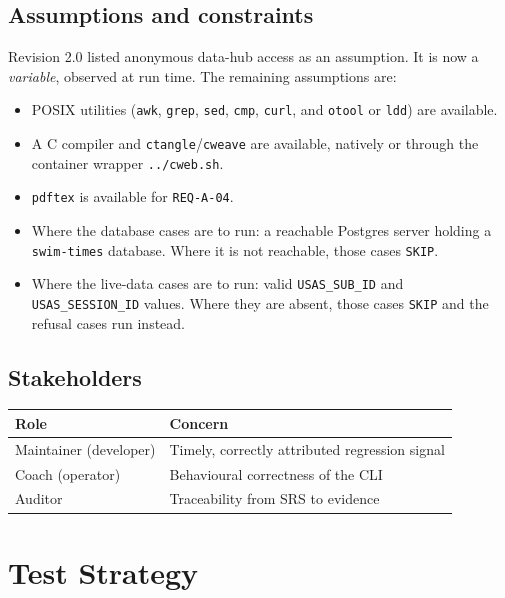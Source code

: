 \documentclass[12pt]{article}
\newcommand{\code}[1]{\texttt{#1}}
\newcommand{\req}[1]{\texttt{#1}}
\begin{document}
\subsection{Assumptions and constraints}

Revision 2.0 listed anonymous data-hub access as an assumption.  It is
now a \emph{variable}, observed at run time.  The remaining assumptions
are:

\begin{itemize}
  \item POSIX utilities (\code{awk}, \code{grep}, \code{sed},
        \code{cmp}, \code{curl}, and \code{otool} or \code{ldd}) are
        available.
  \item A C compiler and \code{ctangle}/\code{cweave} are available,
        natively or through the container wrapper \code{../cweb.sh}.
  \item \code{pdftex} is available for \req{REQ-A-04}.
  \item Where the database cases are to run: a reachable Postgres
        server holding a \code{swim-times} database.  Where it is not
        reachable, those cases \code{SKIP}.
  \item Where the live-data cases are to run: valid
        \code{USAS\_SUB\_ID} and \code{USAS\_SESSION\_ID} values.
        Where they are absent, those cases \code{SKIP} and the refusal
        cases run instead.
\end{itemize}

\subsection{Stakeholders}

\begin{center}
\begin{tabular}{ll}
  \toprule
  \textbf{Role}          & \textbf{Concern}                                \\
  \midrule
  Maintainer (developer) & Timely, correctly attributed regression signal  \\
  Coach (operator)       & Behavioural correctness of the CLI              \\
  Auditor                & Traceability from SRS to evidence               \\
  \bottomrule
\end{tabular}
\end{center}

\section{Test Strategy}
\end{document}
